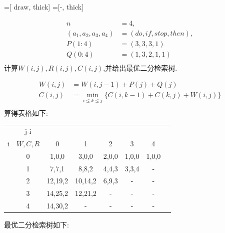 \documentclass[../../main.tex]{subfiles}
\begin{document}
=[ draw, thick]
=[-, thick]
\begin{problem}
    \begin{align*}
        n &= 4, \\
        (a_1, a_2, a_3, a_4) &= (do,if,stop,then), \\
        P(1:4) &=(3,3,3,1)\\
        Q(0:4) &=(1,3,2,1,1)\\
    \end{align*}
    计算\(W(i,j),R(i,j),C(i,j)\),并给出最优二分检索树.
\end{problem}
\begin{solution}
    \begin{align*}
        W(i,j) &= W(i,j-1) + P(j) + Q(j)\\
        C(i,j) &= \min_{i \leq k \leq j} \{C(i,k-1) + C(k,j) + W(i,j)\}\\
    \end{align*}
    算得表格如下:
    \begin{table}[H]
        \centering
        \begin{tabular}{cc|cccccc}
            &j-i& &  &  &  &  \\
            i&\(W,C,R\)& 0 &1 & 2 & 3 & 4  \\
            \hline
            &0&1,0,0&3,0,0&2,0,0&1,0,0&1,0,0\\
            &1&7,7,1&8,8,2&4,4,3&3,3,4& - \\
            &2&12,19,2&10,14,2&6,9,3& - & - \\
            &3&14,25,2&12,21,2& - & - & - \\
            &4&14,30,2& - & - & - & - \\
        \end{tabular}
    \end{table}
    最优二分检索树如下:
    \begin{center}
    \end{center}
\end{solution}
\end{document}
